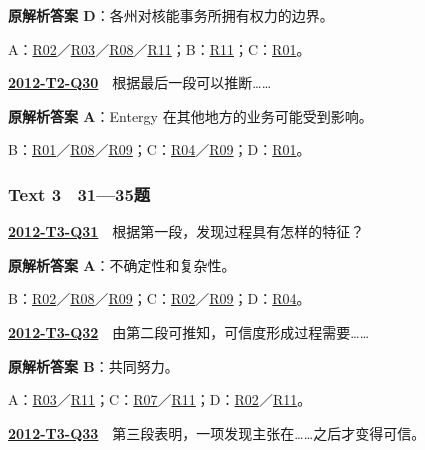 \documentclass[11pt,a4paper]{article}
\begin{document}
\noindent\textbf{原解析答案 D}：各州对核能事务所拥有权力的边界。\par\nopagebreak
\noindent A：\hyperref[cat-R02]{R02}／\hyperref[cat-R03]{R03}／\hyperref[cat-R08]{R08}／\hyperref[cat-R11]{R11}；B：\hyperref[cat-R11]{R11}；C：\hyperref[cat-R01]{R01}。\par\smallskip
{}\label{idx-2012-T2-Q30}\noindent\textbf{\href{https://zj139.github.io/math-notes/english/a4585bde3b2a6d949145bd53/\#q30}{2012-T2-Q30}}　根据最后一段可以推断……\par\nopagebreak
\noindent\textbf{原解析答案 A}：Entergy 在其他地方的业务可能受到影响。\par\nopagebreak
\noindent B：\hyperref[cat-R01]{R01}／\hyperref[cat-R08]{R08}／\hyperref[cat-R09]{R09}；C：\hyperref[cat-R04]{R04}／\hyperref[cat-R09]{R09}；D：\hyperref[cat-R01]{R01}。\par\smallskip
\clearpage
{}\subsubsection{Text 3　31—35题}
\label{idx-2012-T3-Q31}\noindent\textbf{\href{https://zj139.github.io/math-notes/english/8d32b42b276b1ab633d587b6/\#q31}{2012-T3-Q31}}　根据第一段，发现过程具有怎样的特征？\par\nopagebreak
\noindent\textbf{原解析答案 A}：不确定性和复杂性。\par\nopagebreak
\noindent B：\hyperref[cat-R02]{R02}／\hyperref[cat-R08]{R08}／\hyperref[cat-R09]{R09}；C：\hyperref[cat-R02]{R02}／\hyperref[cat-R09]{R09}；D：\hyperref[cat-R04]{R04}。\par\smallskip
{}\label{idx-2012-T3-Q32}\noindent\textbf{\href{https://zj139.github.io/math-notes/english/8d32b42b276b1ab633d587b6/\#q32}{2012-T3-Q32}}　由第二段可推知，可信度形成过程需要……\par\nopagebreak
\noindent\textbf{原解析答案 B}：共同努力。\par\nopagebreak
\noindent A：\hyperref[cat-R03]{R03}／\hyperref[cat-R11]{R11}；C：\hyperref[cat-R07]{R07}／\hyperref[cat-R11]{R11}；D：\hyperref[cat-R02]{R02}／\hyperref[cat-R11]{R11}。\par\smallskip
{}\label{idx-2012-T3-Q33}\noindent\textbf{\href{https://zj139.github.io/math-notes/english/8d32b42b276b1ab633d587b6/\#q33}{2012-T3-Q33}}　第三段表明，一项发现主张在……之后才变得可信。\par\nopagebreak
\end{document}
